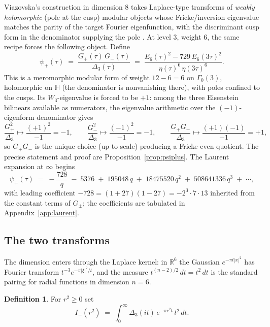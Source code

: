 \documentclass[11pt,reqno]{amsart}
\theoremstyle{plain}
\theoremstyle{definition}
\newtheorem{definition}[theorem]{Definition}
\theoremstyle{remark}
\newcommand{\R}{\mathbb{R}}
\newcommand{\HH}{\mathbb{H}}
\newcommand{\Dthree}{\Delta_{3}}
\newcommand{\psip}{\psi_{+}}
\newcommand{\Imm}{I_{-}}
\begin{document}
Viazovska's construction in dimension $8$ takes Laplace-type
transforms of \emph{weakly holomorphic} (pole at the cusp) modular
objects whose Fricke/inversion eigenvalue matches the parity of the
target Fourier eigenfunction, with the discriminant cusp form in the
denominator supplying the pole \cite{Viazovska2017}.  At level $3$,
weight $6$, the same recipe forces the following object.  Define
\begin{equation}\label{eq:psiplus}
\psip(\tau)
\;=\;\frac{G_+(\tau)\,G_-(\tau)}{\Dthree(\tau)}
\;=\;\frac{E_6(\tau)^2-729\,E_6(3\tau)^2}{\eta(\tau)^6\,\eta(3\tau)^6}.
\end{equation}
This is a meromorphic modular form of weight $12-6=6$ on
$\Gamma_0(3)$, holomorphic on $\HH$ (the denominator is nonvanishing
there), with poles confined to the cusps.  Its $W_3$-eigenvalue is
forced to be $+1$: among the three Eisenstein bilinears available as
numerators, the eigenvalue arithmetic over the $(-1)$-eigenform
denominator gives
\[
\frac{G_+^2}{\Dthree}\mapsto\frac{(+1)^2}{-1}=-1,\qquad
\frac{G_-^2}{\Dthree}\mapsto\frac{(-1)^2}{-1}=-1,\qquad
\frac{G_+G_-}{\Dthree}\mapsto\frac{(+1)(-1)}{-1}=+1 ,
\]
so $G_+G_-$ is the unique choice (up to scale) producing a Fricke-even
quotient.  The precise statement and proof are
Proposition~\ref{prop:psiplus}.  The Laurent expansion at $\infty$
begins
\begin{equation}\label{eq:psilaurent}
\psip(\tau)\;=\;-\frac{728}{q}\;-\;5376\;+\;195048\,q
\;+\;18475520\,q^2\;+\;508641336\,q^3\;+\;\cdots ,
\end{equation}
with leading coefficient
$-728=(1+27)(1-27)=-2^3\cdot7\cdot13$ inherited from the constant
terms of $G_\pm$; the coefficients are tabulated in
Appendix~\ref{app:laurent}.

\subsection{The two transforms}\label{subsec:transforms}

The dimension enters through the Laplace kernel: in $\R^6$ the
Gaussian $e^{-\pi t|x|^2}$ has Fourier transform
$t^{-3}e^{-\pi|\xi|^2/t}$, and the measure $t^{(n-2)/2}\,dt=t^2\,dt$
is the standard pairing for radial functions in dimension $n=6$.

\begin{definition}\label{def:Iminus}
For $r^2\ge0$ set
\[
\Imm(r^2)\;=\;\int_0^\infty \Dthree(it)\,e^{-\pi r^2t}\,t^2\,dt .
\]
\end{definition}
\end{document}
